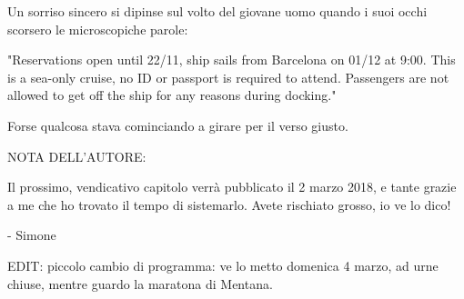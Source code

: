 Un sorriso sincero si dipinse sul volto del giovane uomo quando i suoi occhi scorsero le microscopiche parole:

"Reservations open until 22/11, ship sails from Barcelona on 01/12 at 9:00. This is a sea-only cruise, no ID or passport is required to attend. Passengers are not allowed to get off the ship for any reasons during docking."

Forse qualcosa stava cominciando a girare per il verso giusto.


NOTA DELL'AUTORE:

Il prossimo, vendicativo capitolo verrà pubblicato il 2 marzo 2018, e tante grazie a me che ho trovato il tempo di sistemarlo. Avete rischiato grosso, io ve lo dico!

- Simone

EDIT: piccolo cambio di programma: ve lo metto domenica 4 marzo, ad urne chiuse, mentre guardo la maratona di Mentana.



